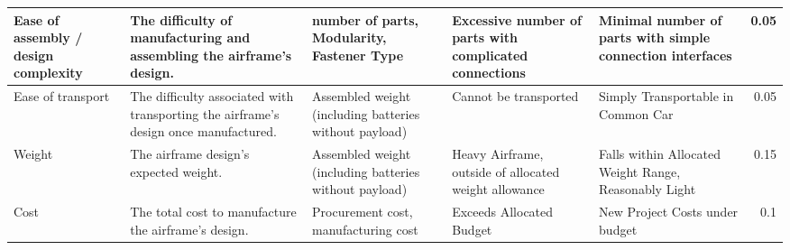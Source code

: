 \begin{table}[H]
{\begin{tabular}{|p{2cm}|p{4cm}|p{4cm}|p{4cm}|p{4cm}|r|}
Ease of assembly / design complexity & The difficulty of manufacturing and assembling the airframe's design.                 & number of parts, Modularity, Fastener Type                                                            & Excessive number of parts with complicated connections   & Minimal number of parts with simple connection interfaces                       & 0.05      \\ \hline
Ease of transport                    & The difficulty associated with transporting the airframe's design once manufactured.  & Assembled weight (including batteries without payload)                                                & Cannot be transported                                                 & Simply Transportable in Common Car                                              & 0.05      \\ \hline
Weight                               & The airframe design's expected weight.                                                & Assembled weight (including batteries without payload)                                                & Heavy Airframe, outside of allocated weight allowance    & Falls within Allocated Weight Range, Reasonably Light                           & 0.15      \\ \hline
Cost                                 & The total cost to manufacture the airframe's design.                                  & Procurement cost, manufacturing cost                                                                  & Exceeds Allocated Budget                                 & New Project Costs under budget                                                  & 0.1       \\ \hline
\end{tabular}%
}
\end{table}




